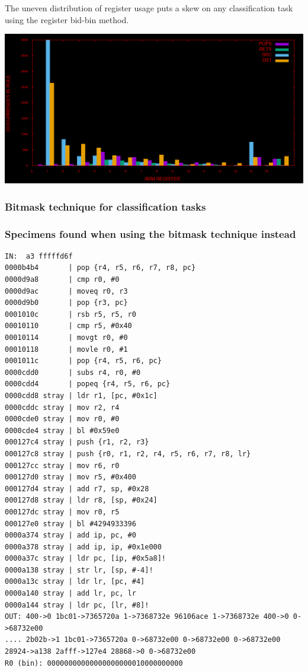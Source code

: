 \documentclass[11pt]{article}
\begin{document}
The uneven distribution of register usage puts a skew on any
classification task using the register bid-bin method. 
\begin{center}
\includegraphics[width=.9\linewidth]{../images/tomato.png}
\end{center}

\subsubsection*{Bitmask technique for classification tasks}
\label{sec:org17ccc65}



\subsubsection*{Specimens found when using the bitmask technique instead}
\label{sec:org176ea4e}

\begin{verbatim}
IN:  a3 fffffd6f
0000b4b4       | pop {r4, r5, r6, r7, r8, pc}
0000d9a8       | cmp r0, #0
0000d9ac       | moveq r0, r3
0000d9b0       | pop {r3, pc}
0001010c       | rsb r5, r5, r0
00010110       | cmp r5, #0x40
00010114       | movgt r0, #0
00010118       | movle r0, #1
0001011c       | pop {r4, r5, r6, pc}
0000cdd0       | subs r4, r0, #0
0000cdd4       | popeq {r4, r5, r6, pc}
0000cdd8 stray | ldr r1, [pc, #0x1c]
0000cddc stray | mov r2, r4
0000cde0 stray | mov r0, #0
0000cde4 stray | bl #0x59e0
000127c4 stray | push {r1, r2, r3}
000127c8 stray | push {r0, r1, r2, r4, r5, r6, r7, r8, lr}
000127cc stray | mov r6, r0
000127d0 stray | mov r5, #0x400
000127d4 stray | add r7, sp, #0x28
000127d8 stray | ldr r8, [sp, #0x24]
000127dc stray | mov r0, r5
000127e0 stray | bl #4294933396
0000a374 stray | add ip, pc, #0
0000a378 stray | add ip, ip, #0x1e000
0000a37c stray | ldr pc, [ip, #0x5a8]!
0000a138 stray | str lr, [sp, #-4]!
0000a13c stray | ldr lr, [pc, #4]
0000a140 stray | add lr, pc, lr
0000a144 stray | ldr pc, [lr, #8]!
OUT: 400->0 1bc01->7365720a 1->7368732e 96106ace 1->7368732e 400->0 0->68732e00 
.... 2b02b->1 1bc01->7365720a 0->68732e00 0->68732e00 0->68732e00 28924->a138 2afff->127e4 28868->0 0->68732e00 
R0 (bin): 00000000000000000000010000000000
\end{verbatim}
\end{document}
